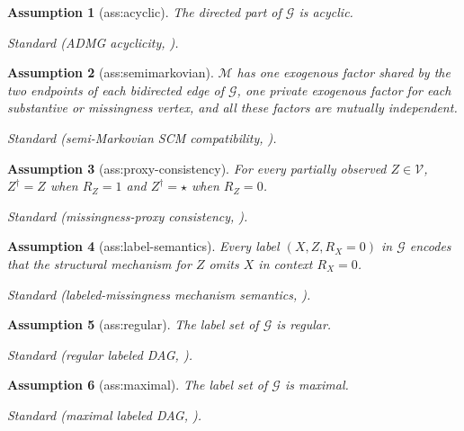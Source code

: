 \documentclass{article}
\newtheorem{assumption}{Assumption}
\begin{document}
\begin{assumption}[ass:acyclic]\label{ass:acyclic}
The directed part of \(\mathcal G\) is acyclic.
\par\smallskip\noindent\emph{Standard} (ADMG acyclicity, \cite{ShpitserPearl2006JointID}).
\end{assumption}

\begin{assumption}[ass:semimarkovian]\label{ass:semimarkovian}
\(\mathcal M\) has one exogenous factor shared by the two endpoints of each bidirected edge of \(\mathcal G\), one private exogenous factor for each substantive or missingness vertex, and all these factors are mutually independent.
\par\smallskip\noindent\emph{Standard} (semi-Markovian SCM compatibility, \cite{ShpitserPearl2006JointID}).
\end{assumption}

\begin{assumption}[ass:proxy-consistency]\label{ass:proxy-consistency}
For every partially observed \(Z\in\mathcal V\), \(Z^{\dagger}=Z\) when \(R_Z=1\) and \(Z^{\dagger}=\star\) when \(R_Z=0\).
\par\smallskip\noindent\emph{Standard} (missingness-proxy consistency, \cite{pmlr-v286-aguas25a}).
\end{assumption}

\begin{assumption}[ass:label-semantics]\label{ass:label-semantics}
Every label \((X,Z,R_X=0)\) in \(\mathcal G\) encodes that the structural mechanism for \(Z\) omits \(X\) in context \(R_X=0\).
\par\smallskip\noindent\emph{Standard} (labeled-missingness mechanism semantics, \cite{pmlr-v286-aguas25a}).
\end{assumption}

\begin{assumption}[ass:regular]\label{ass:regular}
The label set of \(\mathcal G\) is regular.
\par\smallskip\noindent\emph{Standard} (regular labeled DAG, \cite{MokhtarianJamshidiEtesamiKiyavash2022}).
\end{assumption}

\begin{assumption}[ass:maximal]\label{ass:maximal}
The label set of \(\mathcal G\) is maximal.
\par\smallskip\noindent\emph{Standard} (maximal labeled DAG, \cite{MokhtarianJamshidiEtesamiKiyavash2022}).
\end{assumption}
\end{document}
